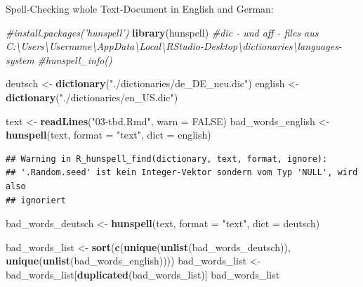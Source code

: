 \documentclass[]{book}
\makeatletter
\newenvironment{Shaded}{\begin{snugshade}}{\end{snugshade}}
\newcommand{\KeywordTok}[1]{\textcolor[rgb]{0.13,0.29,0.53}{\textbf{{#1}}}}
\newcommand{\DataTypeTok}[1]{\textcolor[rgb]{0.13,0.29,0.53}{{#1}}}
\newcommand{\StringTok}[1]{\textcolor[rgb]{0.31,0.60,0.02}{{#1}}}
\newcommand{\CommentTok}[1]{\textcolor[rgb]{0.56,0.35,0.01}{\textit{{#1}}}}
\newcommand{\OtherTok}[1]{\textcolor[rgb]{0.56,0.35,0.01}{{#1}}}
\newcommand{\NormalTok}[1]{{#1}}
\newenvironment{kframe}{%
\medskip{}
\setlength{\fboxsep}{.8em}
 \def\at@end@of@kframe{}%
 \ifinner\ifhmode%
  \def\at@end@of@kframe{\end{minipage}}%
  \begin{minipage}{\columnwidth}%
 \fi\fi%
 \def\FrameCommand##1{\hskip\@totalleftmargin \hskip-\fboxsep
 \colorbox{shadecolor}{##1}\hskip-\fboxsep
     \hskip-\linewidth \hskip-\@totalleftmargin \hskip\columnwidth}%
 \MakeFramed {\advance\hsize-\width
   \@totalleftmargin\z@ \linewidth\hsize
   \@setminipage}}%
 {\par\unskip\endMakeFramed%
 \at@end@of@kframe}
\renewenvironment{Shaded}{\begin{kframe}}{\end{kframe}}
\theoremstyle{definition}
\theoremstyle{definition}
\theoremstyle{remark}
\makeatother
\begin{document}
Spell-Checking whole Text-Document in English and German:

\begin{Shaded}
\begin{Highlighting}[]
\CommentTok{#install.packages('hunspell')}
\KeywordTok{library}\NormalTok{(hunspell)}
\CommentTok{#dic - und aff - files aus C:\textbackslash{}Users\textbackslash{}Username\textbackslash{}AppData\textbackslash{}Local\textbackslash{}RStudio-Desktop\textbackslash{}dictionaries\textbackslash{}languages-system}
\CommentTok{#hunspell_info()}

\NormalTok{deutsch <-}\StringTok{ }\KeywordTok{dictionary}\NormalTok{(}\StringTok{"./dictionaries/de_DE_neu.dic"}\NormalTok{)}
\NormalTok{english <-}\StringTok{ }\KeywordTok{dictionary}\NormalTok{(}\StringTok{"./dictionaries/en_US.dic"}\NormalTok{)}

\NormalTok{text <-}\StringTok{ }\KeywordTok{readLines}\NormalTok{(}\StringTok{"03-tbd.Rmd"}\NormalTok{, }\DataTypeTok{warn =} \OtherTok{FALSE}\NormalTok{)}
\NormalTok{bad_words_english <-}\StringTok{ }\KeywordTok{hunspell}\NormalTok{(text, }\DataTypeTok{format =} \StringTok{"text"}\NormalTok{, }\DataTypeTok{dict =} \NormalTok{english)}
\end{Highlighting}
\end{Shaded}

\begin{verbatim}
## Warning in R_hunspell_find(dictionary, text, format, ignore):
## '.Random.seed' ist kein Integer-Vektor sondern vom Typ 'NULL', wird also
## ignoriert
\end{verbatim}

\begin{Shaded}
\begin{Highlighting}[]
\NormalTok{bad_words_deutsch <-}\StringTok{ }\KeywordTok{hunspell}\NormalTok{(text, }\DataTypeTok{format =} \StringTok{"text"}\NormalTok{, }\DataTypeTok{dict =} \NormalTok{deutsch)}

\NormalTok{bad_words_list <-}\StringTok{ }\KeywordTok{sort}\NormalTok{(}\KeywordTok{c}\NormalTok{(}\KeywordTok{unique}\NormalTok{(}\KeywordTok{unlist}\NormalTok{(bad_words_deutsch)), }\KeywordTok{unique}\NormalTok{(}\KeywordTok{unlist}\NormalTok{(bad_words_english))))}
\NormalTok{bad_words_list <-}\StringTok{ }\NormalTok{bad_words_list[}\KeywordTok{duplicated}\NormalTok{(bad_words_list)]}
\NormalTok{bad_words_list}
\end{Highlighting}
\end{Shaded}
\end{document}
